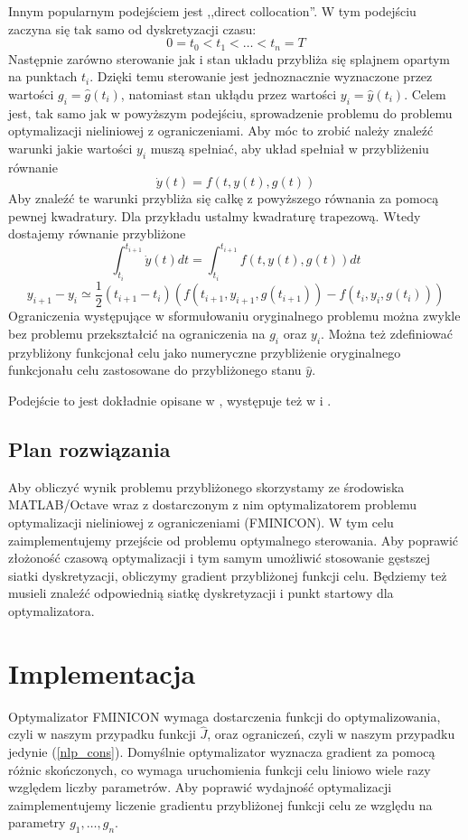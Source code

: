 \documentclass[11pt]{article}
\begin{document}
Innym popularnym podejściem jest ,,direct collocation''. W tym podejściu zaczyna się tak samo od dyskretyzacji czasu:
\[0 = t_0 < t_1 < \ldots < t_n = T\]
Następnie zarówno sterowanie jak i stan układu przybliża się splajnem opartym na punktach $t_i$. Dzięki temu sterowanie jest jednoznacznie wyznaczone przez wartości $g_i = \hat{g}(t_i)$, natomiast stan ukłądu przez wartości $y_i = \hat{y}(t_i)$. Celem jest, tak samo jak w powyższym podejściu, sprowadzenie problemu do problemu optymalizacji nieliniowej z ograniczeniami. Aby móc to zrobić należy znaleźć warunki jakie wartości $y_i$ muszą spełniać, aby układ spełniał w przybliżeniu równanie
\[\dot{y}(t) = f(t,y(t),g(t))\]
Aby znaleźć te warunki przybliża się całkę z powyższego równania za pomocą pewnej kwadratury. Dla przykładu ustalmy kwadraturę trapezową. Wtedy dostajemy równanie przybliżone
\[\int_{t_i}^{t_{i+1}} \dot{y}(t)dt = \int_{t_i}^{t_{i+1}} f(t,y(t),g(t))dt\]
\[y_{i+1} - y_{i} \simeq \frac{1}{2}(t_{i+1}-t_i)(f(t_{i+1}, y_{i+1}, g(t_{i+1})) - f(t_i, y_i, g(t_i)))\]
Ograniczenia występujące w sformułowaniu oryginalnego problemu można zwykle bez problemu przekształcić na ograniczenia na $g_i$ oraz $y_i$. Można też zdefiniować przybliżony funkcjonał celu jako numeryczne przybliżenie oryginalnego funkcjonału celu zastosowane do przybliżonego stanu $\hat{y}$.

Podejście to jest dokładnie opisane w \cite{Kelly}, występuje też w \cite{diehl} i \cite{rao-methods}.

\subsection{Plan rozwiązania}
Aby obliczyć wynik problemu przybliżonego skorzystamy ze środowiska MATLAB/Octave wraz z dostarczonym z nim optymalizatorem problemu optymalizacji nieliniowej z ograniczeniami (FMINICON). W tym celu zaimplementujemy przejście od problemu optymalnego sterowania. Aby poprawić złożoność czasową optymalizacji i tym samym umożliwić stosowanie gęstszej siatki dyskretyzacji, obliczymy gradient przybliżonej funkcji celu. Będziemy też musieli znaleźć odpowiednią siatkę dyskretyzacji i punkt startowy dla optymalizatora.

\section{Implementacja}
Optymalizator FMINICON wymaga dostarczenia funkcji do optymalizowania, czyli w naszym przypadku funkcji $\hat{J}$, oraz ograniczeń, czyli w naszym przypadku jedynie (\ref{nlp_cons}). Domyślnie optymalizator wyznacza gradient za pomocą różnic skończonych, co wymaga uruchomienia funkcji celu liniowo wiele razy względem liczby parametrów. Aby poprawić wydajność optymalizacji zaimplementujemy liczenie gradientu przybliżonej funkcji celu ze względu na parametry $g_1,\ldots, g_n$.
\end{document}
